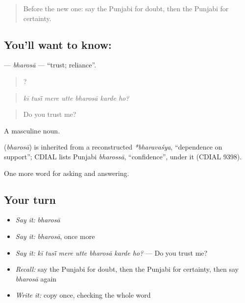 \label{lesson:PA-C341-bharosa}



\begin{quote}
Before the new one: say the Punjabi for doubt, then the Punjabi for certainty.
\end{quote}

\subsection*{You'll want to know: }
\textbf{} — \emph{bharosā} — \textquotedblleft{}trust; reliance\textquotedblright{}.

\begin{quote}
      ?
\end{quote}

\begin{quote}
\emph{kī tusī̃ mere utte bharosā karde ho?}
\end{quote}

\begin{quote}
Do you trust me?
\end{quote}

A masculine noun.

\begin{cousinweb}
\textbf{} (\emph{bharosā}) is inherited from a reconstructed \emph{*bharavaśya}, \textquotedblleft{}dependence on support\textquotedblright{}; CDIAL lists Punjabi \emph{bharossā}, \textquotedblleft{}confidence\textquotedblright{}, under it (CDIAL 9398).
\end{cousinweb}

\begin{grammarlens}[title={What you've built}]
One more word for asking and answering.
\end{grammarlens}

\subsection*{Your turn}
\begin{itemize}
\raggedright
  \item \emph{Say it:} \emph{bharosā}
  \item \emph{Say it:} \emph{bharosā}, once more
  \item \emph{Say it:} \emph{kī tusī̃ mere utte bharosā karde ho?} — Do you trust me?
  \item \emph{Recall:} say the Punjabi for doubt, then the Punjabi for certainty, then say \emph{bharosā} again
  \item \emph{Write it:} copy \textbf{} once, checking the whole word
\end{itemize}


